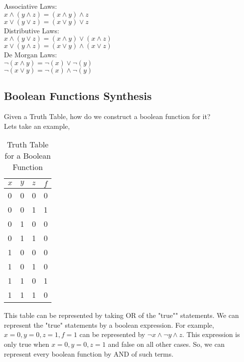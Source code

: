 Associative Laws:\\

$x \land (y \land z) = (x \land y) \land z$\\
$x \lor (y \lor z) = (x \lor y) \lor z$\\

Distributive Laws:\\

$x \land (y \lor z) = (x \land y) \lor (x \land z)$\\
$x \lor (y \land z) = (x \lor y) \land (x \lor z)$\\

De Morgan Laws:\\

$\neg(x \land y) = \neg(x) \lor \neg(y)$\\
$\neg(x \lor y) = \neg(x) \land \neg(y)$\\

\subsection{Boolean Functions Synthesis}

Given a Truth Table, how do we construct a boolean function for it?\\

Lets take an example, 

\begin{table}[h!]
    \begin{center} 
        \caption{Truth Table for a Boolean Function}
        \label{tab:example1}
        \begin{tabular}{l|l|l|l}
            $x$ & $y$ & $z$ & $f$\\
            \hline
            0 & 0 & 0 & 0\\
            0 & 0 & 1 & 1\\
            0 & 1 & 0 & 0\\
            0 & 1 & 1 & 0\\
            1 & 0 & 0 & 0\\
            1 & 0 & 1 & 0\\
            1 & 1 & 0 & 1\\
            1 & 1 & 1 & 0\\
        \end{tabular}
    \end{center}
\end{table}

This table can be represented by taking OR of the "true"" statements. 
We can represent the "true" statements by a boolean expression.
For example, $x = 0, y = 0, z = 1, f = 1$ can be represented by
$\neg x \land \neg y \land z$. This expression is only true when
$x = 0, y = 0, z = 1$ and false on all other cases. So, we can
represent every boolean function by AND of such terms.\\

